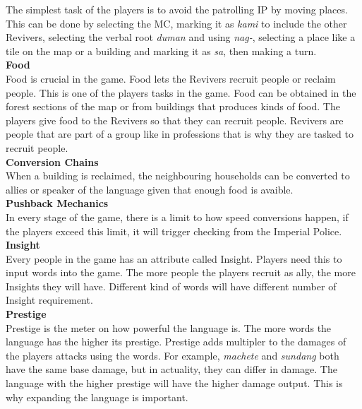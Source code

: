 \documentclass[11pt]{article}
\begin{document}
The simplest task of the players is to avoid the patrolling IP by moving places. This can be done by selecting the MC, marking it as \textit{kami} to include the other Revivers, selecting the verbal root \textit{duman} and using \textit{nag-}, selecting a place like a tile on the map or a building and marking it as \textit{sa}, then making a turn.\\

\textbf{Food}\\
Food is crucial in the game. Food lets the Revivers recruit people or reclaim people. This is one of the players tasks in the game. Food can be obtained in the forest sections of the map or from buildings that produces kinds of food. The players give food to the Revivers so that they can recruit people. Revivers are people that are part of a group like in professions that is why they are tasked to recruit people.\\

\textbf{Conversion Chains}\\
When a building is reclaimed, the neighbouring households can be converted to allies or speaker of the language given that enough food is avaible.\\

\textbf{Pushback Mechanics}\\
In every stage of the game, there is a limit to how speed conversions happen, if the players exceed this limit, it will trigger checking from the Imperial Police.\\

\textbf{Insight}\\
Every people in the game has an attribute called Insight. Players need this to input words into the game. The more people the players recruit as ally, the more Insights they will have. Different kind of words will have different number of Insight requirement.\\

\hypertarget{prestige}{\textbf{Prestige}}\\
Prestige  is the meter on how powerful the language is. The more words the language has the higher its prestige. Prestige adds multipler to the damages of the players attacks using the words. For example, \textit{machete} and \textit{sundang} both have the same base damage, but in actuality, they can differ in damage. The language with the higher prestige will have the higher damage output. This is why expanding the language is important.\\
\end{document}
